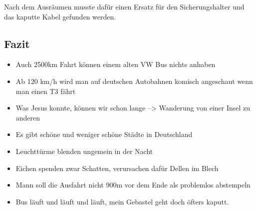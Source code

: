 Nach dem Ausräumen musste dafür einen Ersatz für den Sicherungshalter und das kaputte Kabel gefunden werden.

\subsection{Fazit}
\begin{itemize}
     \item Auch 2500km Fahrt können einem alten VW Bus nichts anhaben
     \item Ab 120 km/h wird man auf deutschen Autobahnen komisch angeschaut wenn man einen T3 fährt
     \item Was Jesus konnte, können wir schon lange --> Wanderung von einer Insel zu anderen
     \item Es gibt schöne und weniger schöne Städte in Deutschland
     \item Leuchttürme blenden ungemein in der Nacht
     \item Eichen spenden zwar Schatten, verursachen dafür Dellen im Blech
     \item Mann soll die Ausfahrt nicht 900m vor dem Ende als problemlos abstempeln
     \item Bus läuft und läuft und läuft, mein Gebastel geht doch öfters kaputt.
\end{itemize} 


